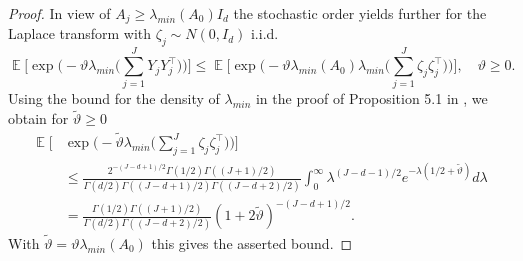 \documentclass[preprint,aos]{imsart}
\numberwithin{equation}{section}
\theoremstyle{remark}
\DeclareMathOperator{\E}{{\mathbb E}}
\DeclareMathOperator{\PP}{{\mathbb P}}
\renewcommand{\theta}{\vartheta}
\renewcommand{\le}{\leqslant}
\renewcommand{\ge}{\geqslant}
\begin{document}
\begin{appendix}
\begin{proof}
In view of $A_j\ge \lambda_{min}(A_0)I_d$ the stochastic order yields further for the Laplace transform with $\zeta_j\sim N(0,I_d)$ i.i.d.
\[ \E\Big[\exp\Big(-\theta\lambda_{min}\Big(\sum_{j=1}^{J}Y_jY_j^\top\Big)\Big)\Big]\le \E\Big[\exp\Big(-\theta\lambda_{min}(A_0)\lambda_{min}\Big(\sum_{j=1}^{J}\zeta_j\zeta_j^\top\Big)\Big)\Big],\quad \theta\ge 0.
\]
Using the bound for the density of $\lambda_{min}$ in the proof of Proposition 5.1 in \citet{Edelman1988}, we obtain for $\tilde\theta\ge 0$
\begin{align*}
\E\Big[&\exp\Big(-\tilde\theta\lambda_{min}\Big(\sum_{j=1}^{J}\zeta_j\zeta_j^\top\Big)\Big)\Big]\\
&\le \tfrac{ 2^{-(J-d+1)/2} \Gamma(1/2)\Gamma((J+1)/2)} {\Gamma(d/2)\Gamma((J-d+1)/2)\Gamma((J-d+2)/2)} \int_0^\infty \lambda^{(J-d-1)/2}e^{-\lambda(1/2+\tilde\theta)}d\lambda\\
&= \tfrac{ \Gamma(1/2)\Gamma((J+1)/2)} {\Gamma(d/2)\Gamma((J-d+2)/2)} (1+2\tilde\theta)^{-(J-d+1)/2}.
\end{align*}
With $\tilde\theta=\theta\lambda_{min}(A_0)$ this gives the asserted bound.
\begin{comment}
By Euler's product formula $\Gamma(z)=z^{-1}\prod_{n\ge 1}(1+1/n)^z(1+z/n)^{-1}$ we can derive for all $0<y<x$ the bound
\[ \frac{\Gamma(x)}{\Gamma(y)\Gamma(x-y)}\le \frac{\Gamma(x)}{\Gamma(x/2)^2}=\frac x4 \prod_{n\ge 1}\Big(1+\Big(4(n/x)^2+4n/x\Big)^{-1}\Big)\le \frac x4 2^x,\]
where the last inequality follows by taking logarithms and comparison with $\int_0^\infty\log(1+(4x^2+4x)^{-1})\,dx=\log 2$. With $x=(J+1)/2$ and $y=\ell/2$ it follows that
\[ \PP\Big(\lambda_{min}\Big(\sum_{j=1}^{J}\zeta_j\zeta_j^\top\Big)\le t\Big) \le \frac{2^{\ell/2} \Gamma(1/2)} {((J-\ell+1)/2)\Gamma((J-\ell+2)/2)} t^{(J-\ell+1)/2}.
\]
Now using the Stirling formula bound $\Gamma(z)\ge \sqrt{2\pi} z^{z-1/2}e^{-z}$ for $z>0$ [Emil Artin, the Gamma Function, 1964] we arrive at
\[ \PP\Big(\lambda_{min}\Big(\sum_{j=1}^{J}\zeta_j\zeta_j^\top\Big)\le t\Big) \le \frac{ (2^{\ell+1}e)^{1/2}} {J-\ell+1} \Big(\frac{2et}{J-\ell+2}\Big)^{(J-\ell+1)/2}.
\]
Replacing $t$ by $(J-\ell+2)t$ and some direct simplifications yield the assertion.
\end{comment}
\end{proof}


\end{appendix}
\end{document}
